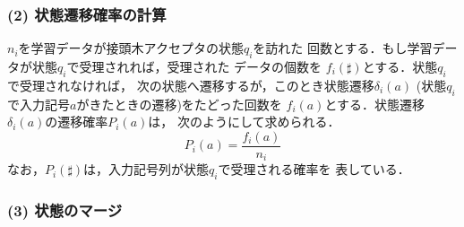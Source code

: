 \subsubsection*{(2) 状態遷移確率の計算}

\hspace{-0.2mm}$n_{i}$\hspace{-0.2mm}を学習データが接頭木アクセプタの状態\hspace{-0.2mm}$q_{i}$\hspace{-0.2mm}を訪れた
回数とする．もし学習データが状態\hspace{-0.2mm}$q_{i}$\hspace{-0.2mm}で受理されれば，受理された
データの個数を \hspace{-0.2mm}$f_{i}(\sharp)$\hspace{-0.2mm}とする．状態\hspace{-0.2mm}$q_{i}$\hspace{-0.2mm}で受理されなければ，
次の状態へ遷移するが，このとき状態遷移\hspace{-0.2mm}$\delta_{i}(a)$\hspace{-0.2mm}
(状態\hspace{-0.2mm}$q_{i}$\hspace{-0.2mm}で入力記号$a$がきたときの遷移)をたどった回数を
\hspace{-0.2mm}$f_{i}(a)$\hspace{-0.2mm}とする．状態遷移\hspace{-0.2mm}$\delta_{i}(a)$\hspace{-0.2mm}の遷移確率\hspace{-0.2mm}$P_{i}(a)$\hspace{-0.2mm}は，
次のようにして求められる．
\vspace{-0.5mm}\begin{equation}
P_{i}(a)=\frac{f_{i}(a)}{n_{i}}
\end{equation}
\vspace{-0.5mm}
なお，\hspace{-0.2mm}$P_{i}(\sharp)$\hspace{-0.2mm}は，入力記号列が状態\hspace{-0.2mm}$q_{i}$\hspace{-0.2mm}で受理される確率を
表している．

\subsubsection*{(3) 状態のマージ}

